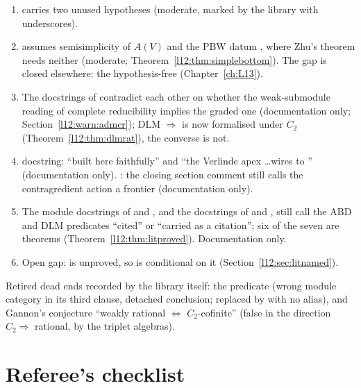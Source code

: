 \begin{enumerate}
\item {}\allowbreak{}\allowbreak{} carries two unused hypotheses (moderate, marked by the library with
  underscores).
\item {}\allowbreak{}\allowbreak{}\allowbreak{}\allowbreak{} assumes semisimplicity of $A(V)$ and the PBW datum , where Zhu's
  theorem needs neither (moderate; Theorem~\ref{l12:thm:simplebottom}). The gap is closed elsewhere: the hypothesis-free
   (Chapter~\ref{ch:L13}).
\item The docstrings of  contradict each other on whether the weak-submodule reading of
  complete reducibility implies the graded one (documentation only; Section~\ref{l12:warn:admcr}); DLM $\Rightarrow$
 is now formalised under $C_2$ (Theorem~\ref{l12:thm:dlmrat}), the converse is not.
\item {} docstring: ``built here faithfully'' and ``the Verlinde apex \ldots wires to '' (documentation only).
  : the closing section comment still calls the contragredient action a frontier (documentation only).
\item The module docstrings of  and , and the docstrings of
   and , still call the ABD and DLM predicates ``cited'' or
  ``carried as a citation''; six of the seven are theorems (Theorem~\ref{l12:thm:litproved}). Documentation only.
\item Open gap:  is unproved, so  is conditional
  on it (Section~\ref{l12:sec:litnamed}).
\end{enumerate}
Retired dead ends recorded by the library itself: the predicate  (wrong module category in its third
clause, detached conclusion; replaced by  with no alias), and Gannon's conjecture ``weakly rational
$\iff$ $C_2$-cofinite'' (false in the direction $C_2\Rightarrow$ rational, by the triplet algebras).

\section{Referee's checklist}\label{l12:sec:checklist}

